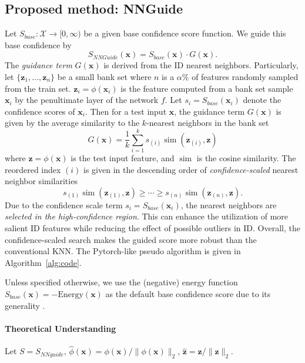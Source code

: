 \documentclass[10pt,twocolumn,letterpaper]{article}
\DeclareMathOperator{\simop}{sim}
\begin{document}
\subsection{Proposed method: NNGuide}
Let $S_{base}: \mathcal{X} \to [0, \infty)$ be a given base confidence score function. We guide this base confidence by 
\begin{equation}
\label{eq:nnguide}
S_{NNGuide}(\mathbf{x}) = S_{base}(\mathbf{x}) \cdot G(\mathbf{x}).
\end{equation}
The \textit{guidance term} $G(\mathbf{x})$ is derived from the ID nearest neighbors. Particularly, let $\{\mathbf{z}_1, \dots, \mathbf{z}_n\}$ be a small bank set where $n$ is a $\alpha \%$ of features randomly sampled from the train set. $\mathbf{z}_i = \phi(\mathbf{x}_i)$ is the feature computed from a bank set sample $\mathbf{x}_i$ by the penultimate layer of the network $f$. Let $s_i = S_{base}(\mathbf{x}_i)$ denote the confidence scores of $\mathbf{x}_i$. Then for a test input $\mathbf{x}$, the guidance term $G(\mathbf{x})$ is given by the average similarity to the $k$-nearest neighbors in the bank set
\begin{equation}
\label{eq:sim_ensemble}
G(\mathbf{x}) = \frac{1}{k} \sum_{i=1}^k s_{(i)} \simop ( \mathbf{z}_{(i)}, \mathbf{z})
\end{equation}
where $\mathbf{z} = \phi(\mathbf{x})$ is the test input feature, and $\simop$ is the cosine similarity. The reordered index $(i)$ is given in the descending order of \textit{confidence-scaled} nearest neighbor similarities
\begin{equation}
\label{eq:conf_scale}
s_{(1)} \simop ( \mathbf{z}_{(1)}, \mathbf{z}) \geq \cdots \geq s_{(n)} \simop ( \mathbf{z}_{(n)}, \mathbf{z}).
\end{equation}
Due to the confidence scale term $s_i = S_{base}(\mathbf{x}_i)$, the nearest neighbors are \textit{selected in the high-confidence region}. This can enhance the utilization of more salient ID features while reducing the effect of possible outliers in ID. Overall, the confidence-scaled search makes the guided score more robust than the conventional KNN. The Pytorch-like pseudo algorithm is given in Algorithm~\ref{alg:code}.

Unless specified otherwise, we use the (negative) energy  function $S_{base}(\mathbf{x}) = - \text{Energy}(\mathbf{x})$ as the default base confidence score  due to its generality \cite{liu2020energy}.

\paragraph{Theoretical Understanding}
Let $S = S_{NNguide}$, $\widehat{\phi}(\mathbf{x}) = \phi(\mathbf{x})/\lVert \phi(\mathbf{x}) \rVert_2$, $\widehat{\mathbf{z}} = \mathbf{z} / \lVert \mathbf{z} \rVert_2$.
\end{document}
